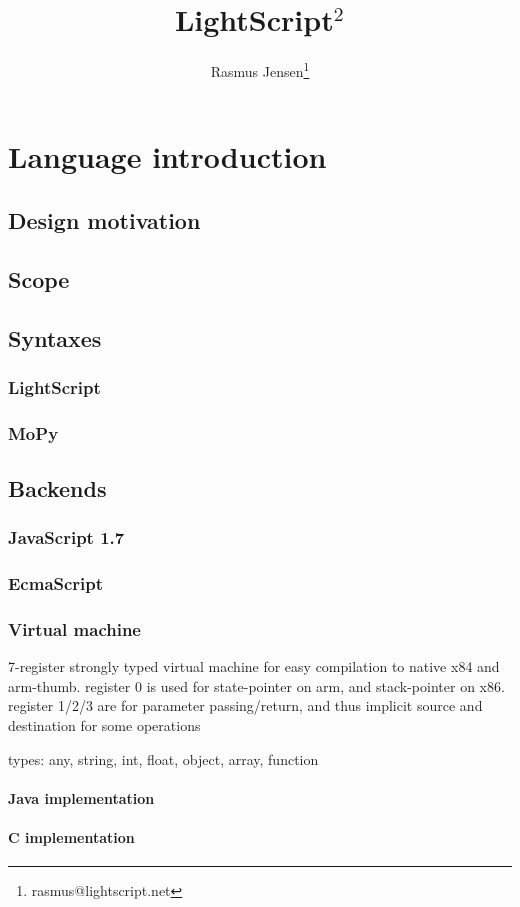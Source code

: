 \documentclass[10pt]{article}
\title{LightScript$^{2}$}
\author{Rasmus Jensen\footnote{rasmus@lightscript.net}}
\begin{document}
\maketitle
\section{Language introduction}
\subsection{Design motivation}
\subsection{Scope}
\subsection{Syntaxes}
\subsubsection{LightScript}
\subsubsection{MoPy}
\subsection{Backends}
\subsubsection{JavaScript 1.7}
\subsubsection{EcmaScript}
\subsubsection{Virtual machine}
7-register strongly typed virtual machine for easy compilation to native x84 and arm-thumb. register 0 is used for state-pointer on arm, and stack-pointer on x86.
register 1/2/3 are for parameter passing/return, and thus implicit source and destination for some operations


types: any, string, int, float, object, array, function
\paragraph{Java implementation}
\paragraph{C implementation}
\end{document}
